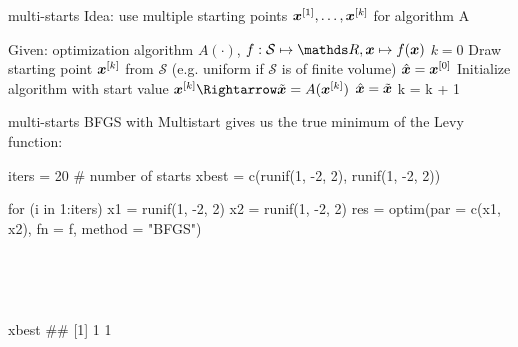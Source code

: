 \documentclass[11pt,compress,t,notes=noshow, xcolor=table]{beamer}
\begin{document}
\begin{framev}{multi-starts}
Idea: use multiple starting points $\bm{x}^{[1]}, \ldots, \bm{x}^{[k]}$ for algorithm A
\begin{algorithm}[H]
\begin{footnotesize}
\begin{center}
\caption{Multistart optimization}
\begin{algorithmic}[1]
\State Given: optimization algorithm $A(\cdot)$, $f: \mathcal{S} \mapsto \R, \xv \mapsto f(\xv)$
\State $k = 0$
\Repeat
\State Draw starting point  $\bm{x}^{[k]}$ from $\mathcal{S}$ (e.g. uniform if $\mathcal{S}$ is of finite volume)
  $\hat{\bm{x}}= \bm{x}^{[0]}$
\EndIf
\State Initialize algorithm with start value $\xv^{[k]} \Rightarrow \tilde{\xv} = A(\xv^{[k]})$
  $\hat{\bm{x}} = \tilde{\bm{x}}$
\EndIf
\State k = k + 1
\\
\Return{$\hat{\xv}$}
\end{algorithmic}
\end{center}
\end{footnotesize}
\end{algorithm}
\end{framev}


\begin{vbframe}{multi-starts}
BFGS with Multistart gives us the true minimum of the Levy function:\\
\spacer
\begin{verbbox}
iters = 20 # number of starts
xbest = c(runif(1, -2, 2), runif(1, -2, 2))
\end{verbbox}
\theverbbox
\vspace{0.4cm}
\begin{verbbox}
for (i in 1:iters) {
x1 = runif(1, -2, 2)
x2 = runif(1, -2, 2)
res = optim(par = c(x1, x2), fn = f, method = "BFGS")
}
\end{verbbox}
\theverbbox\\
\spacer
{}
\theverbbox\\
\spacer
\begin{verbbox}
xbest
## [1] 1 1
\end{verbbox}
\theverbbox
\end{vbframe}

\endlecture
\end{document}
